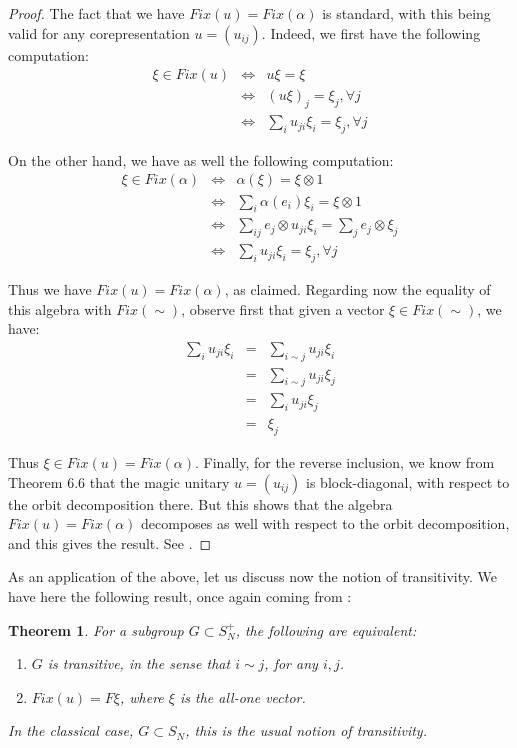 \documentclass[12pt]{amsbook}
\newtheorem{theorem}{Theorem}[chapter]
\begin{document}
\begin{proof}
The fact that we have $Fix(u)=Fix(\alpha)$ is standard, with this being valid for any corepresentation $u=(u_{ij})$. Indeed, we first have the following computation:
\begin{eqnarray*}
\xi\in Fix(u)
&\iff&u\xi=\xi\\
&\iff&(u\xi)_j=\xi_j,\forall j\\
&\iff&\sum_iu_{ji}\xi_i=\xi_j,\forall j
\end{eqnarray*}

On the other hand, we have as well the following computation:
\begin{eqnarray*}
\xi\in Fix(\alpha)
&\iff&\alpha(\xi)=\xi\otimes1\\
&\iff&\sum_i\alpha(e_i)\xi_i=\xi\otimes1\\
&\iff&\sum_{ij}e_j\otimes u_{ji}\xi_i=\sum_je_j\otimes\xi_j\\
&\iff&\sum_iu_{ji}\xi_i=\xi_j,\forall j
\end{eqnarray*}

Thus we have $Fix(u)=Fix(\alpha)$, as claimed. Regarding now the equality of this algebra with $Fix(\sim)$, observe first that given a vector $\xi\in Fix(\sim)$, we have:
\begin{eqnarray*}
\sum_iu_{ji}\xi_i
&=&\sum_{i\sim j}u_{ji}\xi_i\\
&=&\sum_{i\sim j}u_{ji}\xi_j\\
&=&\sum_iu_{ji}\xi_j\\
&=&\xi_j
\end{eqnarray*}

Thus $\xi\in Fix(u)=Fix(\alpha)$. Finally, for the reverse inclusion, we know from Theorem 6.6 that the magic unitary $u=(u_{ij})$ is block-diagonal, with respect to the orbit decomposition there. But this shows that the algebra $Fix(u)=Fix(\alpha)$ decomposes as well with respect to the orbit decomposition, and this gives the result. See \cite{bi4}.
\end{proof}

As an application of the above, let us discuss now the notion of transitivity. We have here the following result, once again coming from \cite{bi4}:

\begin{theorem}
For a subgroup $G\subset S_N^+$, the following are equivalent:
\begin{enumerate}
\item $G$ is transitive, in the sense that $i\sim j$, for any $i,j$.

\item $Fix(u)=F\xi$, where $\xi$ is the all-one vector.
\end{enumerate}
In the classical case, $G\subset S_N$, this is the usual notion of transitivity.
\end{theorem}
\end{document}
